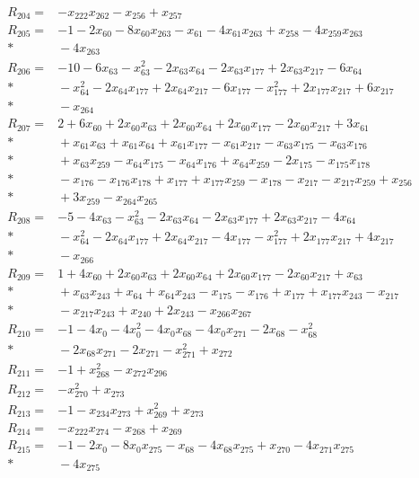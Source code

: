 \begin{align*}
R_{204}={}&-x_{222}x_{262}-x_{256}+x_{257}\\[3pt]
R_{205}={}&-1-2x_{60}-8x_{60}x_{263}-x_{61}-4x_{61}x_{263}+x_{258}-4x_{259}x_{263}\\*
&{}-4x_{263}\\[3pt]
R_{206}={}&-10-6x_{63}-x_{63}^{2}-2x_{63}x_{64}-2x_{63}x_{177}+2x_{63}x_{217}-6x_{64}\\*
&{}-x_{64}^{2}-2x_{64}x_{177}+2x_{64}x_{217}-6x_{177}-x_{177}^{2}+2x_{177}x_{217}+6x_{217}\\*
&{}-x_{264}\\[3pt]
R_{207}={}&2+6x_{60}+2x_{60}x_{63}+2x_{60}x_{64}+2x_{60}x_{177}-2x_{60}x_{217}+3x_{61}\\*
&{}+x_{61}x_{63}+x_{61}x_{64}+x_{61}x_{177}-x_{61}x_{217}-x_{63}x_{175}-x_{63}x_{176}\\*
&{}+x_{63}x_{259}-x_{64}x_{175}-x_{64}x_{176}+x_{64}x_{259}-2x_{175}-x_{175}x_{178}\\*
&{}-x_{176}-x_{176}x_{178}+x_{177}+x_{177}x_{259}-x_{178}-x_{217}-x_{217}x_{259}+x_{256}\\*
&{}+3x_{259}-x_{264}x_{265}\\[3pt]
R_{208}={}&-5-4x_{63}-x_{63}^{2}-2x_{63}x_{64}-2x_{63}x_{177}+2x_{63}x_{217}-4x_{64}\\*
&{}-x_{64}^{2}-2x_{64}x_{177}+2x_{64}x_{217}-4x_{177}-x_{177}^{2}+2x_{177}x_{217}+4x_{217}\\*
&{}-x_{266}\\[3pt]
R_{209}={}&1+4x_{60}+2x_{60}x_{63}+2x_{60}x_{64}+2x_{60}x_{177}-2x_{60}x_{217}+x_{63}\\*
&{}+x_{63}x_{243}+x_{64}+x_{64}x_{243}-x_{175}-x_{176}+x_{177}+x_{177}x_{243}-x_{217}\\*
&{}-x_{217}x_{243}+x_{240}+2x_{243}-x_{266}x_{267}\\[3pt]
R_{210}={}&-1-4x_{0}-4x_{0}^{2}-4x_{0}x_{68}-4x_{0}x_{271}-2x_{68}-x_{68}^{2}\\*
&{}-2x_{68}x_{271}-2x_{271}-x_{271}^{2}+x_{272}\\[3pt]
R_{211}={}&-1+x_{268}^{2}-x_{272}x_{296}\\[3pt]
R_{212}={}&-x_{270}^{2}+x_{273}\\[3pt]
R_{213}={}&-1-x_{234}x_{273}+x_{269}^{2}+x_{273}\\[3pt]
R_{214}={}&-x_{222}x_{274}-x_{268}+x_{269}\\[3pt]
R_{215}={}&-1-2x_{0}-8x_{0}x_{275}-x_{68}-4x_{68}x_{275}+x_{270}-4x_{271}x_{275}\\*
&{}-4x_{275}\\[3pt]

\end{align*}

